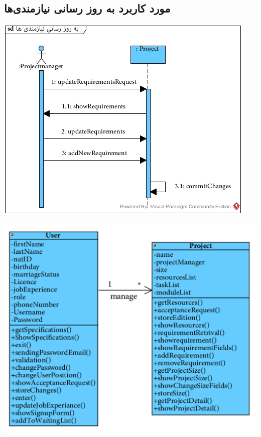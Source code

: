 \newpage
\vspace{2cm}
\subsection*{مورد کاربرد به روز رسانی نیازمندی‌ها}
\vspace{2cm}
\begin{center}
\includegraphics[width=\textwidth]{SequenceDiagrams/24.jpg}
\end{center}


\newpage
\vspace{2cm}
\begin{center}
\includegraphics[width=\textwidth]{SequenceClasses/24.png}
\end{center}

